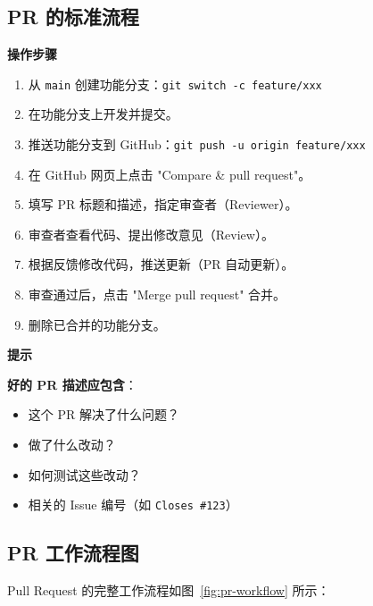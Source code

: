\documentclass[12pt,a4paper,openany]{ctexbook}
\newenvironment{tipbox}{%
  \medskip
  \noindent\textbf{\faLightbulb\; 提示}
  \smallskip
}{%
  \medskip
}
\newenvironment{stepbox}{%
  \medskip
  \noindent\textbf{\faCogs\; 操作步骤}
  \smallskip
}{%
  \medskip
}
\begin{document}
\subsection{PR 的标准流程}

\begin{stepbox}
\begin{enumerate}[leftmargin=1.5em]
  \item 从 \texttt{main} 创建功能分支：\texttt{git switch -c feature/xxx}
  \item 在功能分支上开发并提交。
  \item 推送功能分支到 GitHub：\texttt{git push -u origin feature/xxx}
  \item 在 GitHub 网页上点击 "Compare \& pull request"。
  \item 填写 PR 标题和描述，指定审查者（Reviewer）。
  \item 审查者查看代码、提出修改意见（Review）。
  \item 根据反馈修改代码，推送更新（PR 自动更新）。
  \item 审查通过后，点击 "Merge pull request" 合并。
  \item 删除已合并的功能分支。
\end{enumerate}
\end{stepbox}

\begin{tipbox}
\textbf{好的 PR 描述应包含}：
\begin{itemize}
  \item 这个 PR 解决了什么问题？
  \item 做了什么改动？
  \item 如何测试这些改动？
  \item 相关的 Issue 编号（如 \texttt{Closes \#123}）
\end{itemize}
\end{tipbox}

\subsection{PR 工作流程图}

Pull Request 的完整工作流程如图~\ref{fig:pr-workflow} 所示：
\end{document}
